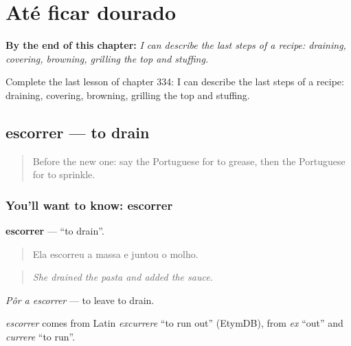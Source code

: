 
\chapter{Até ficar dourado}
\label{ch:pt-ate-ficar-dourado}

\begin{chapteropening}
\textbf{By the end of this chapter:} \emph{I can describe the last steps of a recipe: draining, covering, browning, grilling the top and stuffing.}

Complete the last lesson of chapter 334: I can describe the last steps of a recipe: draining, covering, browning, grilling the top and stuffing.
\end{chapteropening}

\section[escorrer]{escorrer — to drain}

\label{lesson:PT-C334-escorrer}



\begin{quote}
Before the new one: say the Portuguese for to grease, then the Portuguese for to sprinkle.
\end{quote}

\subsection*{You'll want to know: escorrer}
\textbf{escorrer} — \textquotedblleft{}to drain\textquotedblright{}.

\begin{quote}
Ela escorreu a massa e juntou o molho.
\end{quote}

\begin{quote}
\emph{She drained the pasta and added the sauce.}
\end{quote}

\emph{Pôr a escorrer} — to leave to drain.

\begin{cousinweb}
\emph{escorrer} comes from Latin \emph{excurrere} \textquotedblleft{}to run out\textquotedblright{} (EtymDB), from \emph{ex} \textquotedblleft{}out\textquotedblright{} and \emph{currere} \textquotedblleft{}to run\textquotedblright{}.
\end{cousinweb}

